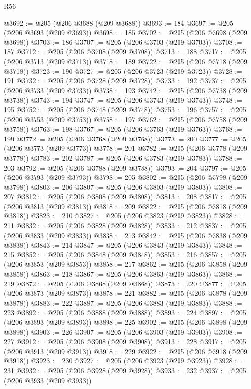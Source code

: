 \begin{lexlean}{R56}
\begin{coremodule}
{{{{{{{{{{{{{{{{{{{{{{{{{{{{{{{{{{{{{{{{{{{{{{{{{{{{{{{{{{{{{{{{{{{{{{{{{{{{{{{{{{{{{{{{{{{{{{{{{{{{{{{{{{{{{{{{{{{{{{{{{{{{{{{{{{{{{{{{{{{{{{{{{{{{{{{{{{{{{{{{{{{{{{{{{{{{{{{{{{{{{{{{{{{{{{{{{{{{{{{{{{{{{{{{{{{@3692 := @205 (@206 @3688 (@209 @3688))
@3693 := 184
@3697 := @205 (@206 @3693 (@209 @3693))
@3698 := 185
@3702 := @205 (@206 @3698 (@209 @3698))
@3703 := 186
@3707 := @205 (@206 @3703 (@209 @3703))
@3708 := 187
@3712 := @205 (@206 @3708 (@209 @3708))
@3713 := 188
@3717 := @205 (@206 @3713 (@209 @3713))
@3718 := 189
@3722 := @205 (@206 @3718 (@209 @3718))
@3723 := 190
@3727 := @205 (@206 @3723 (@209 @3723))
@3728 := 191
@3732 := @205 (@206 @3728 (@209 @3728))
@3733 := 192
@3737 := @205 (@206 @3733 (@209 @3733))
@3738 := 193
@3742 := @205 (@206 @3738 (@209 @3738))
@3743 := 194
@3747 := @205 (@206 @3743 (@209 @3743))
@3748 := 195
@3752 := @205 (@206 @3748 (@209 @3748))
@3753 := 196
@3757 := @205 (@206 @3753 (@209 @3753))
@3758 := 197
@3762 := @205 (@206 @3758 (@209 @3758))
@3763 := 198
@3767 := @205 (@206 @3763 (@209 @3763))
@3768 := 199
@3772 := @205 (@206 @3768 (@209 @3768))
@3773 := 200
@3777 := @205 (@206 @3773 (@209 @3773))
@3778 := 201
@3782 := @205 (@206 @3778 (@209 @3778))
@3783 := 202
@3787 := @205 (@206 @3783 (@209 @3783))
@3788 := 203
@3792 := @205 (@206 @3788 (@209 @3788))
@3793 := 204
@3797 := @205 (@206 @3793 (@209 @3793))
@3798 := 205
@3802 := @205 (@206 @3798 (@209 @3798))
@3803 := 206
@3807 := @205 (@206 @3803 (@209 @3803))
@3808 := 207
@3812 := @205 (@206 @3808 (@209 @3808))
@3813 := 208
@3817 := @205 (@206 @3813 (@209 @3813))
@3818 := 209
@3822 := @205 (@206 @3818 (@209 @3818))
@3823 := 210
@3827 := @205 (@206 @3823 (@209 @3823))
@3828 := 211
@3832 := @205 (@206 @3828 (@209 @3828))
@3833 := 212
@3837 := @205 (@206 @3833 (@209 @3833))
@3838 := 213
@3842 := @205 (@206 @3838 (@209 @3838))
@3843 := 214
@3847 := @205 (@206 @3843 (@209 @3843))
@3848 := 215
@3852 := @205 (@206 @3848 (@209 @3848))
@3853 := 216
@3857 := @205 (@206 @3853 (@209 @3853))
@3858 := 217
@3862 := @205 (@206 @3858 (@209 @3858))
@3863 := 218
@3867 := @205 (@206 @3863 (@209 @3863))
@3868 := 219
@3872 := @205 (@206 @3868 (@209 @3868))
@3873 := 220
@3877 := @205 (@206 @3873 (@209 @3873))
@3878 := 221
@3882 := @205 (@206 @3878 (@209 @3878))
@3883 := 222
@3887 := @205 (@206 @3883 (@209 @3883))
@3888 := 223
@3892 := @205 (@206 @3888 (@209 @3888))
@3893 := 224
@3897 := @205 (@206 @3893 (@209 @3893))
@3898 := 225
@3902 := @205 (@206 @3898 (@209 @3898))
@3903 := 226
@3907 := @205 (@206 @3903 (@209 @3903))
@3908 := 227
@3912 := @205 (@206 @3908 (@209 @3908))
@3913 := 228
@3917 := @205 (@206 @3913 (@209 @3913))
@3918 := 229
@3922 := @205 (@206 @3918 (@209 @3918))
@3923 := 230
@3927 := @205 (@206 @3923 (@209 @3923))
@3928 := 231
@3932 := @205 (@206 @3928 (@209 @3928))
@3933 := 232
@3937 := @205 (@206 @3933 (@209 @3933))
}}}}}}}}}}}}}}}}}}}}}}}}}}}}}}}}}}}}}}}}}}}}}}}}}}}}}}}}}}}}}}}}}}}}}}}}}}}}}}}}}}}}}}}}}}}}}}}}}}}}}}}}}}}}}}}}}}}}}}}}}}}}}}}}}}}}}}}}}}}}}}}}}}}}}}}}}}}}}}}}}}}}}}}}}}}}}}}}}}}}}}}}}}}}}}}}}}}}}}}}}}}}}}}}}}}
\end{coremodule}
\end{lexlean}
